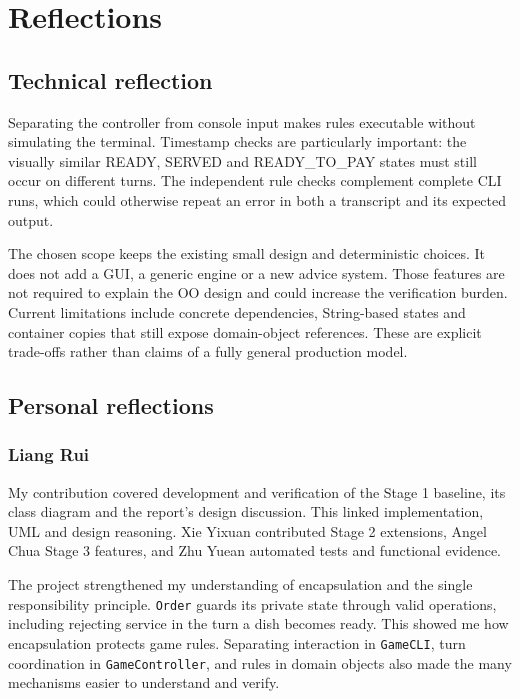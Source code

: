 \section{Reflections}

\subsection{Technical reflection}
Separating the controller from console input makes rules executable without
simulating the terminal. Timestamp checks are particularly important: the
visually similar READY, SERVED and READY\_TO\_PAY states must still occur on
different turns. The independent rule checks complement complete CLI runs,
which could otherwise repeat an error in both a transcript and its expected output.

The chosen scope keeps the existing small design and deterministic choices.
It does not add a GUI, a generic engine or a new advice system. Those features
are not required to explain the OO design and could increase the verification
burden. Current limitations include concrete dependencies, String-based states
and container copies that still expose domain-object references. These are
explicit trade-offs rather than claims of a fully general production model.

\subsection{Personal reflections}

\subsubsection*{Liang Rui}
My contribution covered development and verification of the Stage 1 baseline, its class diagram and
the report's design discussion. This linked implementation, UML and design reasoning. Xie Yixuan
contributed Stage 2 extensions, Angel Chua Stage 3 features, and Zhu Yuean automated tests and
functional evidence.

The project strengthened my understanding of encapsulation and the single responsibility principle.
\texttt{Order} guards its private state through valid operations, including rejecting service in the
turn a dish becomes ready. This showed me how encapsulation protects game rules. Separating
interaction in \texttt{GameCLI}, turn coordination in \texttt{GameController}, and rules in domain
objects also made the many mechanisms easier to understand and verify.

